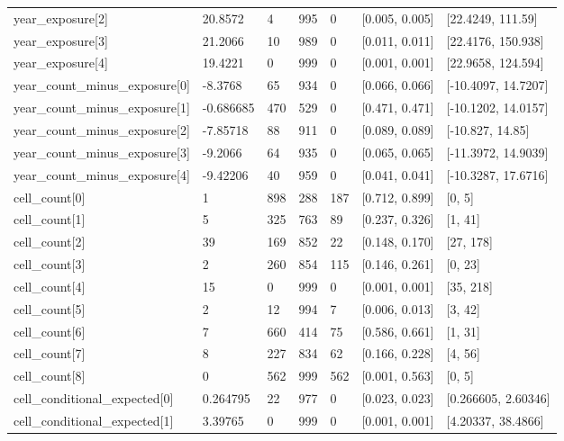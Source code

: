 \begin{longtable}
{}year\_\allowbreak{}exposure[2] & 20.8572 & 4 & 995 & 0 & [0.005, 0.005] & [22.4249, 111.59] \\
{}year\_\allowbreak{}exposure[3] & 21.2066 & 10 & 989 & 0 & [0.011, 0.011] & [22.4176, 150.938] \\
{}year\_\allowbreak{}exposure[4] & 19.4221 & 0 & 999 & 0 & [0.001, 0.001] & [22.9658, 124.594] \\
{}year\_\allowbreak{}count\_\allowbreak{}minus\_\allowbreak{}exposure[0] & -8.3768 & 65 & 934 & 0 & [0.066, 0.066] & [-10.4097, 14.7207] \\
{}year\_\allowbreak{}count\_\allowbreak{}minus\_\allowbreak{}exposure[1] & -0.686685 & 470 & 529 & 0 & [0.471, 0.471] & [-10.1202, 14.0157] \\
{}year\_\allowbreak{}count\_\allowbreak{}minus\_\allowbreak{}exposure[2] & -7.85718 & 88 & 911 & 0 & [0.089, 0.089] & [-10.827, 14.85] \\
{}year\_\allowbreak{}count\_\allowbreak{}minus\_\allowbreak{}exposure[3] & -9.2066 & 64 & 935 & 0 & [0.065, 0.065] & [-11.3972, 14.9039] \\
{}year\_\allowbreak{}count\_\allowbreak{}minus\_\allowbreak{}exposure[4] & -9.42206 & 40 & 959 & 0 & [0.041, 0.041] & [-10.3287, 17.6716] \\
{}cell\_\allowbreak{}count[0] & 1 & 898 & 288 & 187 & [0.712, 0.899] & [0, 5] \\
{}cell\_\allowbreak{}count[1] & 5 & 325 & 763 & 89 & [0.237, 0.326] & [1, 41] \\
{}cell\_\allowbreak{}count[2] & 39 & 169 & 852 & 22 & [0.148, 0.170] & [27, 178] \\
{}cell\_\allowbreak{}count[3] & 2 & 260 & 854 & 115 & [0.146, 0.261] & [0, 23] \\
{}cell\_\allowbreak{}count[4] & 15 & 0 & 999 & 0 & [0.001, 0.001] & [35, 218] \\
{}cell\_\allowbreak{}count[5] & 2 & 12 & 994 & 7 & [0.006, 0.013] & [3, 42] \\
{}cell\_\allowbreak{}count[6] & 7 & 660 & 414 & 75 & [0.586, 0.661] & [1, 31] \\
{}cell\_\allowbreak{}count[7] & 8 & 227 & 834 & 62 & [0.166, 0.228] & [4, 56] \\
{}cell\_\allowbreak{}count[8] & 0 & 562 & 999 & 562 & [0.001, 0.563] & [0, 5] \\
{}cell\_\allowbreak{}conditional\_\allowbreak{}expected[0] & 0.264795 & 22 & 977 & 0 & [0.023, 0.023] & [0.266605, 2.60346] \\
{}cell\_\allowbreak{}conditional\_\allowbreak{}expected[1] & 3.39765 & 0 & 999 & 0 & [0.001, 0.001] & [4.20337, 38.4866] \\

\end{longtable}
